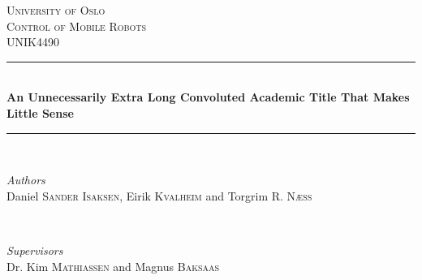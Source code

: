 \documentclass[a4paper,10pt]{article}
\begin{document}

\begin{titlepage} %
	\newcommand{\HRule}{\rule{\linewidth}{0.5mm}} %
	
	\center %
	
	
	\textsc{\LARGE University of Oslo}\\[1.5cm] %
	
	\textsc{\Large Control of Mobile Robots}\\[0.5cm] %
	
	\textsc{\large UNIK4490}\\[0.5cm] %
	
	
	\HRule\\[0.4cm]
	
	{\huge\bfseries An Unnecessarily Extra Long Convoluted Academic Title That Makes Little Sense}\\[0.4cm] %
	
	\HRule\\[1.5cm]
	
	
	\begin{minipage}{0.4\textwidth}
		\begin{flushleft}
			\large
			\textit{Authors}\\
			Daniel \textsc{Sander Isaksen}, Eirik \textsc{Kvalheim} and Torgrim \textsc{R. Næss}
		\end{flushleft}
	\end{minipage}
	~
	\begin{minipage}{0.4\textwidth}
		\begin{flushright}
			\large
			\textit{Supervisors}\\
			Dr. Kim \textsc{Mathiassen} and Magnus \textsc{Baksaas}
		\end{flushright}
	\end{minipage}
	

\end{titlepage}
\end{document}
